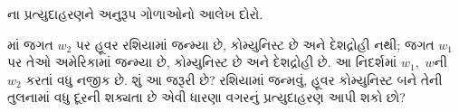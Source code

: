 \documentclass[../../../include/open-logic-section]{subfiles}
\begin{document}
\begin{prob}
ના પ્રત્યુદાહરણને અનુરૂપ
ગોળાઓનો આલેખ દોરો.
\end{prob}

\begin{prob}
  માં જગત $w_2$ પર હૂવર
  રશિયામાં જન્મ્યા છે, કોમ્યુનિસ્ટ છે અને દેશદ્રોહી નથી; જગત $w_1$
  પર તેઓ અમેરિકામાં જન્મ્યા છે, કોમ્યુનિસ્ટ છે અને દેશદ્રોહી છે.
  આ નિદર્શમાં $w_1$,~$w$ની $w_2$ કરતાં વધુ નજીક છે. શું આ જરૂરી
  છે? રશિયામાં જન્મવું, હૂવર કોમ્યુનિસ્ટ બને તેની તુલનામાં વધુ દૂરની
  શક્યતા છે એવી ધારણા વગરનું પ્રત્યુદાહરણ આપી શકો છો?
\end{prob}
\end{document}
